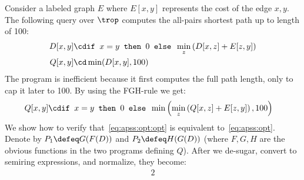 \begin{ex}[APSP100]\label{ex:sssp100}
  Consider a labeled graph $E$ where $E[x,y]$ represents the cost of
  the edge $x,y$.  The following query over $\trop$
  computes the all-pairs shortest
  path up to length of 100:
%
{\footnotesize
  \begin{align}
    D[x,y] \cd & \texttt{if } x=y \texttt{ then } 0 \texttt{ else } \min_{z} \left(D[x,z] +E[z,y]\right) \nonumber \\
    Q[x,y] \cd & \min(D[x,y],100)  \label{eq:apss:opt}
  \end{align}
}
%
%
%
  The program is inefficient because it first computes the full path
  length, only to cap it later to 100.  By using the FGH-rule we get:
%
{\footnotesize
  \begin{align}
    Q[x,y] \cd & \texttt{if } x=y \texttt{ then } 0 \texttt{ else } \min\left(\min_{z} \left(Q[x,z]+E[z,y]\right),100\right) \label{eq:apss:opt:opt}
  \end{align}
}
%
We show how to verify
that~\eqref{eq:apss:opt:opt} is equivalent to~\eqref{eq:apss:opt}.
Denote by $P_1 \defeq G(F(D))$ and $P_2 \defeq H(G(D))$ (where $F,G,H$
are the obvious functions in the two programs defining $Q$).  After we
de-sugar, convert to semiring expressions, and normalize,
they become:
%
{\footnotesize
\begin{alignat*}{2}

\end{alignat*}}
\end{ex}
